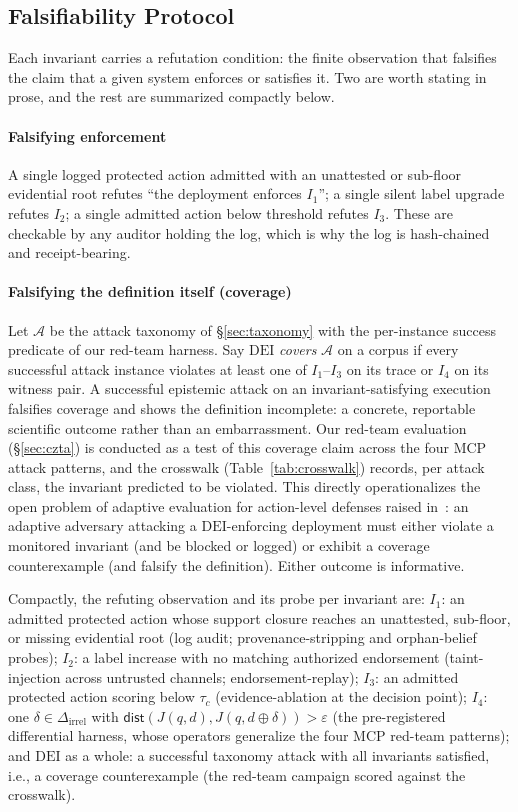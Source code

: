 \documentclass[conference]{IEEEtran}
\newcommand{\Ione}{\ensuremath{I_1}}
\newcommand{\Itwo}{\ensuremath{I_2}}
\newcommand{\Ithree}{\ensuremath{I_3}}
\newcommand{\Ifour}{\ensuremath{I_4}}
\newcommand{\Dirrel}{\ensuremath{\Delta_{\mathrm{irrel}}}}
\newcommand{\dist}{\ensuremath{\mathsf{dist}}}
\newcommand{\DEI}{\ensuremath{\mathrm{DEI}}}
\begin{document}
\subsection{Falsifiability Protocol}
\label{sec:falsifiability}
Each invariant carries a refutation condition: the finite
observation that falsifies the claim that a given system enforces
or satisfies it. Two are worth stating in prose, and the rest are
summarized compactly below.

\paragraph*{Falsifying enforcement}
A single logged protected action admitted with an unattested or
sub-floor evidential root refutes ``the deployment enforces
\Ione''; a single silent label upgrade refutes \Itwo; a single
admitted action below threshold refutes \Ithree. These are
checkable by any auditor holding the log, which is why the log is
hash-chained and receipt-bearing.

\paragraph*{Falsifying the definition itself (coverage)}
Let $\mathcal{A}$ be the attack taxonomy of
\S\ref{sec:taxonomy} with the per-instance success predicate of
our red-team harness. Say \DEI{} \emph{covers} $\mathcal{A}$ on a
corpus if every successful attack instance violates at least one
of \Ione--\Ithree{} on its trace or \Ifour{} on its witness pair.
A successful epistemic attack on an invariant-satisfying execution
falsifies coverage and shows the definition incomplete: a
concrete, reportable scientific outcome rather than an
embarrassment. Our red-team evaluation (\S\ref{sec:czta}) is
conducted as a test of this coverage claim across the four MCP
attack patterns, and the crosswalk (Table~\ref{tab:crosswalk})
records, per attack class, the invariant predicted to be violated.
This directly operationalizes the open problem of adaptive
evaluation for action-level defenses raised in~\cite{oob}: an
adaptive adversary attacking a \DEI-enforcing deployment must
either violate a monitored invariant (and be blocked or logged) or
exhibit a coverage counterexample (and falsify the
definition). Either outcome is informative.

Compactly, the refuting observation and its probe per invariant
are: \Ione: an admitted protected action whose support closure
reaches an unattested, sub-floor, or missing evidential root (log
audit; provenance-stripping and orphan-belief probes); \Itwo: a
label increase with no matching authorized endorsement
(taint-injection across untrusted channels; endorsement-replay);
\Ithree: an admitted protected action scoring below $\tau_c$
(evidence-ablation at the decision point); \Ifour: one
$\delta \in \Dirrel$ with $\dist(J(q,d), J(q,d \oplus \delta)) > \varepsilon$
(the pre-registered differential harness, whose operators
generalize the four MCP red-team patterns); and \DEI{} as a
whole: a successful taxonomy attack with all invariants
satisfied, i.e., a coverage counterexample (the red-team campaign
scored against the crosswalk).
\end{document}
